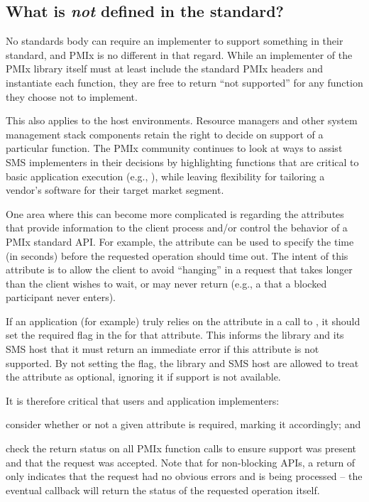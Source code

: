 \subsection{What is \emph{not} defined in the standard?}

No standards body can require an implementer to support something in their standard, and \ac{PMIx} is no different in that regard. While an implementer of the \ac{PMIx} library itself must at least include the standard \ac{PMIx} headers and instantiate each function, they are free to return ``not supported'' for any function they choose not to implement.

This also applies to the host environments. Resource managers and other system management stack components retain the right to decide on support of a particular function. The \ac{PMIx} community continues to look at ways to assist \ac{SMS} implementers in their decisions by highlighting functions that are critical to basic application execution (e.g., ), while leaving flexibility for tailoring a vendor's software for their target market segment.

One area where this can become more complicated is regarding the attributes that provide information to the client process and/or control the behavior of a \ac{PMIx} standard \ac{API}. For example, the  attribute can be used to specify the time (in seconds) before the requested operation should time out. The intent of this attribute is to allow the client to avoid ``hanging'' in a request that takes longer than the client wishes to wait, or may never return (e.g., a  that a blocked participant never enters).

If an application (for example) truly relies on the  attribute in a call to , it should set the required flag in the  for that attribute. This informs the library and its \ac{SMS} host that it must return an immediate error if this attribute is not supported. By not setting the flag, the library and \ac{SMS} host are allowed to treat the attribute as optional, ignoring it if support is not available.

It is therefore critical that users and application implementers:

\begin{compactalphaenum}
\item consider whether or not a given attribute is required, marking it accordingly; and

\item check the return status on all \ac{PMIx} function calls to ensure support was present and that the request was accepted. Note that for non-blocking \acp{API}, a return of  only indicates that the request had no obvious errors and is being processed – the eventual callback will return the status of the requested operation itself.
\end{compactalphaenum}

